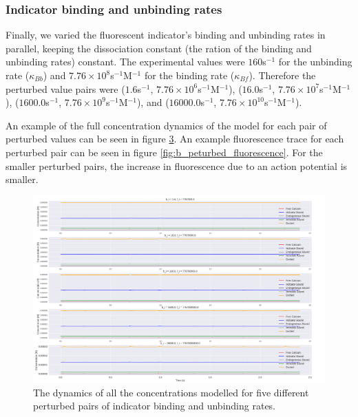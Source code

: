 \documentclass[a4paper,12pt]{article}
\theoremstyle{definition}
\begin{document}
\begin{figure}[p]
\begin{subfigure}{\textwidth}
    \label{fig:immobile_perturbed_spike_inference_oasis}
  \end{subfigure}
  \caption{}
\end{figure}

\subsubsection{Indicator binding and unbinding rates}
Finally, we varied the fluorescent indicator's binding and unbinding rates in parallel, keeping the dissociation constant (the ration of the binding and unbinding rates) constant. The experimental values were $160$s$^{-1}$ for the unbinding rate ($\kappa_{Bb}$) and $7.76\times10^{8}$s$^{-1}$M$^{-1}$ for the binding rate ($\kappa_{Bf}$). Therefore the perturbed value pairs were ($1.6$s$^{-1}$, $7.76\times10^{6}$s$^{-1}$M$^{-1}$), ($16.0$s$^{-1}$, $7.76\times10^{7}$s$^{-1}$M$^{-1}$), ($1600.0$s$^{-1}$, $7.76\times10^{9}$s$^{-1}$M$^{-1}$), and ($16000.0$s$^{-1}$, $7.76\times10^{10}$s$^{-1}$M$^{-1}$).

An example of the full concentration dynamics of the model for each pair of perturbed values can be seen in figure \ref{fig:b_peturbed_calcium_dynamics}. An example fluorescence trace for each perturbed pair can be seen in figure \ref{fig:b_peturbed_fluorescence}. For the smaller perturbed pairs, the increase in fluorescence due to an action potential is smaller.

\begin{figure}[ht]
  \centering
  \includegraphics[width=\textwidth]{figures/b_peturbed_calcium_dynamics_18.png}
  \caption{The dynamics of all the concentrations modelled for five different perturbed pairs of indicator binding and unbinding rates.}
  \label{fig:b_peturbed_calcium_dynamics}
\end{figure}
\end{document}
